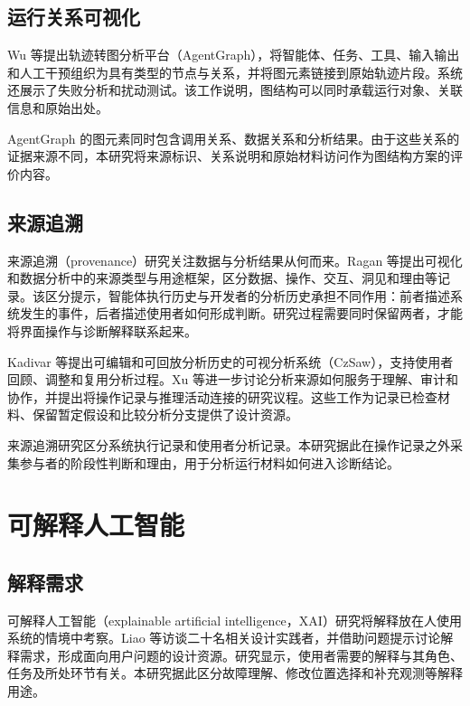 \subsection{运行关系可视化}

Wu 等\cite{ref23}提出轨迹转图分析平台（AgentGraph），将智能体、任务、工具、输入输出和人工干预组织为具有类型的节点与关系，并将图元素链接到原始轨迹片段。系统还展示了失败分析和扰动测试。该工作说明，图结构可以同时承载运行对象、关联信息和原始出处。

AgentGraph 的图元素同时包含调用关系、数据关系和分析结果。由于这些关系的证据来源不同，本研究将来源标识、关系说明和原始材料访问作为图结构方案的评价内容。

\subsection{来源追溯}

来源追溯（provenance）研究关注数据与分析结果从何而来。Ragan 等\cite{ref36}提出可视化和数据分析中的来源类型与用途框架，区分数据、操作、交互、洞见和理由等记录。该区分提示，智能体执行历史与开发者的分析历史承担不同作用：前者描述系统发生的事件，后者描述使用者如何形成判断。研究过程需要同时保留两者，才能将界面操作与诊断解释联系起来。

Kadivar 等\cite{ref38}提出可编辑和可回放分析历史的可视分析系统（CzSaw），支持使用者回顾、调整和复用分析过程。Xu 等\cite{ref37}进一步讨论分析来源如何服务于理解、审计和协作，并提出将操作记录与推理活动连接的研究议程。这些工作为记录已检查材料、保留暂定假设和比较分析分支提供了设计资源。

来源追溯研究区分系统执行记录和使用者分析记录。本研究据此在操作记录之外采集参与者的阶段性判断和理由，用于分析运行材料如何进入诊断结论。

\section{可解释人工智能}

\subsection{解释需求}

可解释人工智能（explainable artificial intelligence，XAI）研究将解释放在人使用系统的情境中考察。Liao 等\cite{ref49}访谈二十名相关设计实践者，并借助问题提示讨论解释需求，形成面向用户问题的设计资源。研究显示，使用者需要的解释与其角色、任务及所处环节有关。本研究据此区分故障理解、修改位置选择和补充观测等解释用途。

